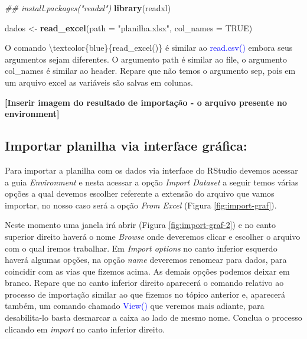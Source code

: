 \documentclass[titlepage, oneside, openany, a4paper]{book}
\newenvironment{Shaded}{\begin{snugshade}}{\end{snugshade}}
\newcommand{\CommentTok}[1]{\textcolor[rgb]{0.56,0.35,0.01}{\textit{#1}}}
\newcommand{\DataTypeTok}[1]{\textcolor[rgb]{0.13,0.29,0.53}{#1}}
\newcommand{\KeywordTok}[1]{\textcolor[rgb]{0.13,0.29,0.53}{\textbf{#1}}}
\newcommand{\NormalTok}[1]{#1}
\newcommand{\OtherTok}[1]{\textcolor[rgb]{0.56,0.35,0.01}{#1}}
\newcommand{\StringTok}[1]{\textcolor[rgb]{0.31,0.60,0.02}{#1}}
\begin{document}
\begin{Shaded}
\begin{Highlighting}[]
\CommentTok{## install.packages("readxl")}
\KeywordTok{library}\NormalTok{(readxl)}
\end{Highlighting}
\end{Shaded}

\begin{Shaded}
\begin{Highlighting}[]
\NormalTok{dados <-}\StringTok{ }\KeywordTok{read_excel}\NormalTok{(}\DataTypeTok{path =} \StringTok{"planilha.xlsx"}\NormalTok{, }\DataTypeTok{col_names =} \OtherTok{TRUE}\NormalTok{)}
\end{Highlighting}
\end{Shaded}

O comando \textbackslash{}textcolor\{blue\}\{read\_excel()\} é similar ao \textcolor{blue}{read.csv()} embora seus argumentos sejam diferentes. O argumento path é similar ao file, o argumento col\_names é similar ao header. Repare que não temos o argumento sep, pois em um arquivo excel as variáveis são salvas em colunas.

\textbf{{[}Inserir imagem do resultado de importação - o arquivo presente no environment{]}}

\hypertarget{importar-planilha-via-interface-gruxe1fica}{%
\subsection{Importar planilha via interface gráfica:}\label{importar-planilha-via-interface-gruxe1fica}}

Para importar a planilha com os dados via interface do RStudio devemos acessar a guia \emph{Environment} e nesta acessar a opção \emph{Import Dataset} a seguir temos várias opções a qual devemos escolher referente a extensão do arquivo que vamos importar, no nosso caso será a opção \emph{From Excel} (Figura \ref{fig:import-graf}).

Neste momento uma janela irá abrir (Figura \ref{fig:import-graf-2}) e no canto superior direito haverá o nome \emph{Browse} onde deveremos clicar e escolher o arquivo com o qual iremos trabalhar. Em \emph{Import options} no canto inferior esquerdo haverá algumas opções, na opção \emph{name} deveremos renomear para dados, para coincidir com as vias que fizemos acima. As demais opções podemos deixar em branco. Repare que no canto inferior direito aparecerá o comando relativo ao processo de importação similar ao que fizemos no tópico anterior e, aparecerá também, um comando chamado \textcolor{blue}{View()} que veremos mais adiante, para desabilita-lo basta desmarcar a caixa ao lado de mesmo nome. Conclua o processo clicando em \emph{import} no canto inferior direito.
\end{document}
